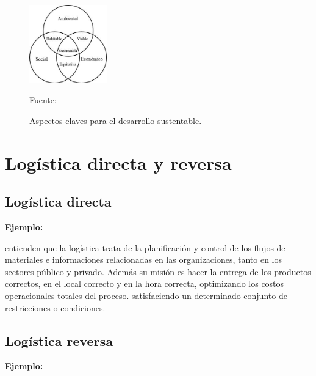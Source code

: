 \begin{figure}[ht]
\begin{center}
\includegraphics[width=0.3\textwidth]{Figura2}
\end{center}
\begin{center}
\vskip -0.5cm
\caption{\small{Aspectos claves para el desarrollo sustentable.}}
{\small{Fuente: \cite{Tanguay}}}
\end{center}
\end{figure}

\section{Logística directa y reversa}

\subsection{Logística directa}

{\bf Ejemplo:}\par

\cite{Ghiani} entienden que la logística trata de la planificación y control de los flujos de materiales e informaciones relacionadas en las organizaciones, tanto en los sectores público y privado. Además su misión es hacer la entrega de los productos correctos, en el local correcto y en la hora correcta, optimizando los costos operacionales totales del proceso.
satisfaciendo un determinado conjunto de restricciones o condiciones.\par

\subsection{Logística reversa}

{\bf Ejemplo:}\par

